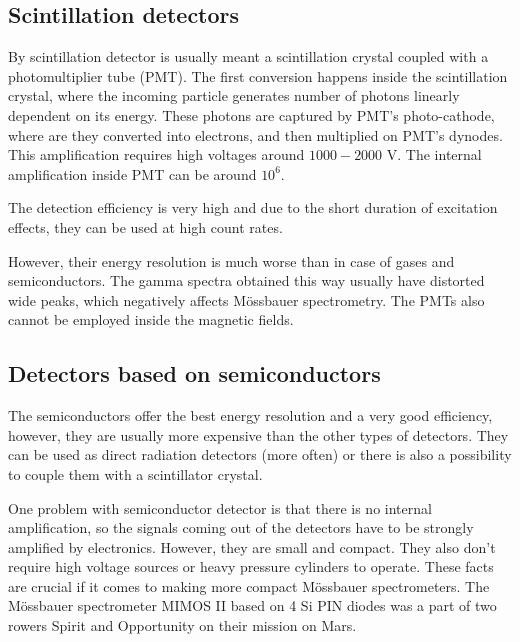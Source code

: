 \subsection{Scintillation detectors}
By scintillation detector is usually meant a scintillation crystal coupled with a photomultiplier tube (PMT). The first conversion happens inside the scintillation crystal, where the incoming particle generates number of photons linearly dependent on its energy. These photons are captured by PMT's photo-cathode, where are they converted into electrons, and then multiplied on PMT's dynodes. This amplification requires high voltages around $1000 - 2000$ V. The internal amplification inside PMT can be around $10^6$.
\par
The detection efficiency is very high and due to the short duration of excitation effects, they can be used at high count rates.
\par
However, their energy resolution is much worse than in case of gases and semiconductors. The gamma spectra obtained this way usually have distorted wide peaks, which negatively affects Mössbauer spectrometry. The PMTs also cannot be employed inside the magnetic fields. 


\subsection{Detectors based on semiconductors}
The semiconductors offer the best energy resolution and a very good efficiency, however, they are usually more expensive than the other types of detectors. They can be used as direct radiation detectors (more often) or there is also a possibility to couple them with a scintillator crystal. 
\par
One problem with semiconductor detector is that there is no internal amplification, so the signals coming out of the detectors have to be strongly amplified by electronics.
However, they are small and compact. They also don't require high voltage sources or heavy pressure cylinders to operate. These facts are crucial if it comes to making more compact Mössbauer spectrometers. The Mössbauer spectrometer MIMOS II \cite{https://doi.org/10.1029/2003JE002138} based on 4 Si PIN diodes was a part of two rowers Spirit and Opportunity on their mission on Mars. 




